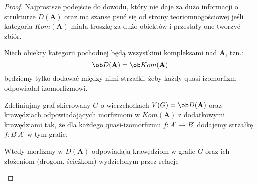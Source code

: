 \begin{proof}
  Najprostsze podejście do dowodu, który nie daje za dużo informacji o strukturze $D(\mathbf{A})$ oraz ma szanse psuć się od strony teoriomnogościowej jeśli kategoria $Kom(\mathbf{A})$ miała troszkę za dużo obiektów i przestały one tworzyć zbiór. 

  Niech obiekty kategorii pochodnej będą wszystkimi kompleksami nad $\mathbf{A}$, tzn.:
  $$\ob D(\mathbf{A})=\ob Kom(\mathbf{A})$$
  będziemy tylko dodawać między nimi strzałki, żeby każdy quasi-izomorfizm odpowiadał izomorfizmowi.

  Zdefiniujmy graf skierowany $G$ o wierzchołkach $V(G)=\ob D(\mathbf{A})$ oraz krawędziach odpowiadających morfizmom w $Kom(\mathbf{A})$ z dodatkowymi krawędziami tak, że dla każdego quasi-izomorfizmu $f:A^\cdot\to B^\cdot$ dodajemy strzałkę $\overline{f}:B^\cdot A^\cdot$ w tym grafie.

  Wtedy morfizmy w $D(\mathbf{A})$ odpowiadają krawędziom w grafie $G$ oraz ich złożeniom (drogom, ścieżkom) wydzielonym przez relację 
  \begin{center}\end{center}
\end{proof}

